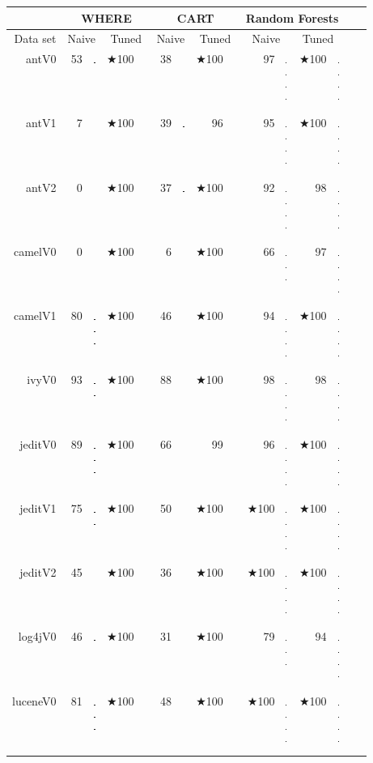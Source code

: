 \documentclass{acm_proc_article-sp}
\newcommand{\crule}[3][darkgray]{\textcolor{#1}{\rule{#2}{#3}}}
\newcommand{\rone}{\crule{1mm}{1.95mm}}
\newcommand{\rtwo}{\crule{1mm}{1.95mm}\hspace{0.3pt}\crule{1mm}{1.95mm}}
\newcommand{\rthree}{\crule{1mm}{1.95mm}\hspace{0.3pt}\crule{1mm}{1.95mm}\hspace{0.3pt}\crule{1mm}{1.95mm}}
\newcommand{\rfour}{\crule{1mm}{1.95mm}\hspace{0.3pt}\crule{1mm}{1.95mm}\hspace{0.3pt}\crule{1mm}{1.95mm}\hspace{0.3pt}\crule{1mm}{1.95mm}}
\begin{document}
\begin{figure}
\renewcommand{\baselinestretch}{0.8} 

\scriptsize  
\begin{tabular}{r|r@{~}l@{~}|r@{~}l|r@{~}l|r@{~}l|r@{~}l@{~}|r@{~}l@{~}r@{~}l}
      &   \multicolumn{4}{c|}{WHERE}         &   \multicolumn{4}{c|}{CART}         &   \multicolumn{4}{c}{Random Forests}         \\\hline
  Data set   &   \multicolumn{2}{c}{Naive}         &   \multicolumn{2}{c|}{Tuned}         &   \multicolumn{2}{c}{Naive}         &   \multicolumn{2}{c|}{Tuned}    &   \multicolumn{2}{c}{Naive}  &   \multicolumn{2}{c}{Tuned}\\\hline
antV0 & 53 & {\rone} & $\bigstar$100 & {\rfour} & 38 &         & $\bigstar$100 & {\rfour} & 97 & {\rfour} & $\bigstar$100 & {\rfour}\\
antV1 & 7 &         & $\bigstar$100 & {\rfour} & 39 & {\rone} & 96 & {\rfour} & 95 & {\rfour} & $\bigstar$100 & {\rfour}\\
antV2 & 0 &         & $\bigstar$100 & {\rfour} & 37 & {\rone} & $\bigstar$100 & {\rfour} & 92 & {\rfour} & 98 & {\rfour}\\
camelV0 & 0 &         & $\bigstar$100 & {\rfour} & 6 &         & $\bigstar$100 & {\rfour} & 66 & {\rthree} & 97 & {\rfour}\\
camelV1 & 80 & {\rthree} & $\bigstar$100 & {\rfour} & 46 &         & $\bigstar$100 & {\rfour} & 94 & {\rfour} & $\bigstar$100 & {\rfour}\\
ivyV0 & 93 & {\rtwo} & $\bigstar$100 & {\rfour} & 88 &         & $\bigstar$100 & {\rfour} & 98 & {\rfour} & 98 & {\rfour}\\
jeditV0 & 89 & {\rthree} & $\bigstar$100 & {\rfour} & 66 &         & 99 & {\rfour} & 96 & {\rfour} & $\bigstar$100 & {\rfour}\\
jeditV1 & 75 & {\rtwo} & $\bigstar$100 & {\rfour} & 50 &         & $\bigstar$100 & {\rfour} & $\bigstar$100 & {\rfour} & $\bigstar$100 & {\rfour}\\
jeditV2 & 45 &         & $\bigstar$100 & {\rfour} & 36 &         & $\bigstar$100 & {\rfour} & $\bigstar$100 & {\rfour} & $\bigstar$100 & {\rfour}\\
log4jV0 & 46 & {\rone} & $\bigstar$100 & {\rfour} & 31 &         & $\bigstar$100 & {\rfour} & 79 & {\rthree} & 94 & {\rfour}\\
luceneV0 & 81 & {\rthree} & $\bigstar$100 & {\rfour} & 48 &         & $\bigstar$100 & {\rfour} & $\bigstar$100 & {\rfour} & $\bigstar$100 & {\rfour}\\

\end{tabular}
\end{figure}
\end{document}

